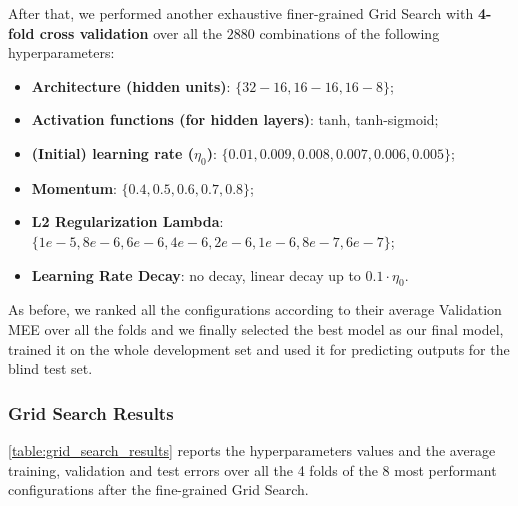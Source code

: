 After that, we performed another exhaustive finer-grained Grid Search with \textbf{4-fold cross validation} over all the $2880$ combinations of the following hyperparameters:
\begin{itemize}
    \item \textbf{Architecture (hidden units)}: $\{32-16, 16-16, 16-8\}$;
    \item \textbf{Activation functions (for hidden layers)}: {tanh, tanh-sigmoid};
    \item \textbf{(Initial) learning rate ($\eta_0$)}: $\{0.01, 0.009, 0.008, 0.007, 0.006, 0.005\}$;
    \item \textbf{Momentum}: $\{0.4, 0.5, 0.6, 0.7, 0.8\}$;
    \item \textbf{L2 Regularization Lambda}: $\{1e-5, 8e-6, 6e-6, 4e-6, 2e-6, 1e-6, 8e-7, 6e-7\}$;
    \item \textbf{Learning Rate Decay}: {no decay, linear decay up to $0.1 \cdot \eta_0$}.
\end{itemize}
As before, we ranked all the configurations according to their average Validation MEE over all the folds and we finally selected the best model as our final model, trained it on the whole development set and used it for predicting outputs for the blind test set.

\subsubsection{Grid Search Results}
\cref{table:grid_search_results} reports the hyperparameters values and the average training, validation and test errors over all the 4 folds of the 8 most performant configurations after the fine-grained Grid Search.

